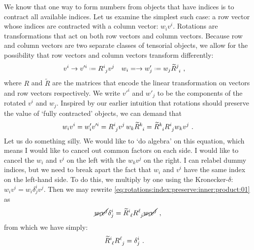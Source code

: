 We know that one way to form numbers from objects that have indices is to contract all available indices. Let us examine the simplest such case: a row vector whose indices are contracted with a column vector: $w_iv^i$. Rotations are transformations that act on both row vectors and column vectors. Because row and column vectors are two separate classes of tensorial objects, we allow for the possibility that row vectors and column vectors transform differently:
\begin{align}
    v^i &\to v'^i \defeq R\aij{i}{j}v^j & w_i &= \to w'_j\defeq w_j \tilde{R}\aij{j}{i} \ ,
    \label{eq:components:of:vector:and:row:under:rotatino}
\end{align}
where $R$ and $\tilde{R}$ are the matrices that encode the linear transformation on vectors and row vectors respectively. We write $v'^i$ and $w'_j$ to be the components of the rotated $v^i$ and $w_j$. Inspired by our earlier intuition that rotations should preserve the value of `fully contracted' objects, we can demand that
\begin{align}
    w_i v^i =w'_i v'^i = R\aij{i}{j}v^j \, w_k\tilde{R}\aij{k}{i}
    =\tilde{R}\aij{k}{i}R\aij{i}{j} w_kv^j \ .
    \label{eq:rotations:index:preserve:inner:product:01}
\end{align}
Let us do something silly. We would like to `do algebra' on this equation, which means I would like to cancel out common factors on each side. I would like to cancel the $w_i$ and $v^i$ on the left with the $w_kv^j$ on the right. I can relabel dummy indices, but we need to break apart the fact that $w_i$ and $v^i$ have the same index on the left-hand side. To do this, we multiply by one using the Kronecker-$\delta$: $w_iv^i = w_i \delta^i_j v^j$. Then we may rewrite  \eqref{eq:rotations:index:preserve:inner:product:01} as
\begin{align}
    \cancel{w_i} \cancel{v^j}  \delta^i_j
    =\tilde{R}\aij{i}{\ell}R\aij{\ell}{j} \cancel{w_i} \cancel{v^j} \ ,
\end{align}
from which we have simply:
\begin{align}
    \tilde{R}\aij{i}{\ell}R\aij{\ell}{j} &= \delta^i_j \ .
    \label{eq:R:Rtilde:transformation:from:indices:rotation}
\end{align}

